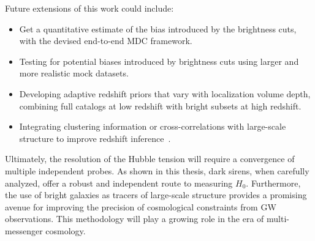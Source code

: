 Future extensions of this work could include:
\vspace{-1em}
\begin{itemize}
    \item Get a quantitative estimate of the bias introduced by the brightness cuts, with the devised end-to-end \ac{MDC} framework.
    \vspace{-1em}
    \item Testing for potential biases introduced by brightness cuts using larger and more realistic mock datasets.
    \vspace{-1em}
    \item Developing adaptive redshift priors that vary with localization volume depth, combining full catalogs at low redshift with bright subsets at high redshift.
    \vspace{-1em}
    \item Integrating clustering information or cross-correlations with large-scale structure to improve redshift inference~\citep{afroz2024prospect}.
\end{itemize}

Ultimately, the resolution of the Hubble tension will require a convergence of multiple independent probes. As shown in this thesis, dark sirens, when carefully analyzed, offer a robust and independent route to measuring $H_0$. Furthermore, the use of bright galaxies as tracers of large-scale structure provides a promising avenue for improving the precision of cosmological constraints from \ac{GW} observations. This methodology will play a growing role in the era of multi-messenger cosmology.
